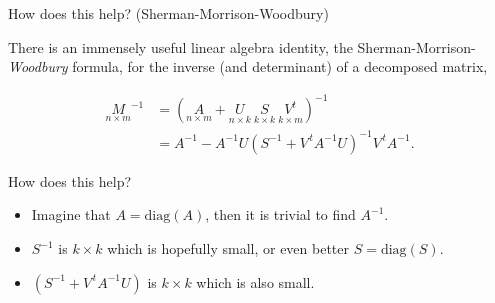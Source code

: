 \documentclass[11pt,ignorenonframetext,]{beamer}
\begin{document}
\begin{frame}[t]{How does this help? (Sherman-Morrison-Woodbury)}
\protect\hypertarget{how-does-this-help-sherman-morrison-woodbury}{}

There is an immensely useful linear algebra identity, the
Sherman-Morrison-\emph{Woodbury} formula, for the inverse (and
determinant) of a decomposed matrix,

\[\begin{aligned}
\underset{n \times m}{M}^{-1} 
&= \left(\underset{n \times m}{A} + \underset{n \times k}{U} ~ \underset{k \times k}{S} ~ \underset{k \times m}{V^t}\right)^{-1} \\
&= A^{-1} - A^{-1} U \left(S^{-1}+V^{\,t} A^{-1} U\right)^{-1}V^{\,t} A^{-1}.
\end{aligned}\]

\pause

How does this help?

\begin{itemize}
\item
  Imagine that \(A = \text{diag}(A)\), then it is trivial to find
  \(A^{-1}\).
\item
  \(S^{-1}\) is \(k \times k\) which is hopefully small, or even better
  \(S = \text{diag}(S)\).
\item
  \(\left(S^{-1}+V^{\,t} A^{-1} U\right)\) is \(k \times k\) which is
  also small.
\end{itemize}

\end{frame}
\end{document}
